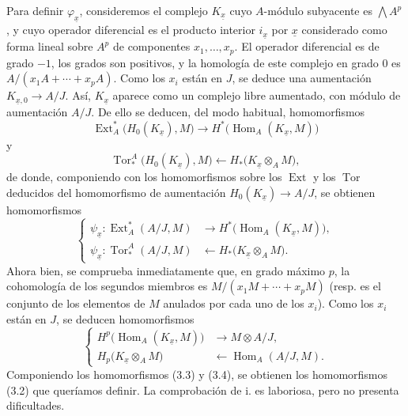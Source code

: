 \documentclass[11pt,twoside,openany]{book}
\numberwithin{equation}{section}
\theoremstyle{plain}
\theoremstyle{definition}
\theoremstyle{remark}
\theoremstyle{plain}
\theoremstyle{definition}
\theoremstyle{remark}
\begin{document}
Para definir $\varphi_{\underline{x}}$, consideremos el complejo
$K_{\underline{x}}$ cuyo $A$-módulo subyacente es $\bigwedge A^{p}$, y
cuyo operador diferencial es el producto interior $i_{\underline{x}}$ por
$\underline{x}$ considerado como forma lineal sobre $A^{p}$ de componentes
$x_1,\ldots,x_p$. El operador diferencial es de grado $-1$, los grados son
positivos, y la homología de este complejo en grado $0$ es
$A/(x_1A+\cdots+x_pA)$. Como los $x_i$ están en $J$, se deduce una
aumentación $K_{\underline{x},0}\longrightarrow A/J$. Así,
$K_{\underline{x}}$ aparece como un complejo libre aumentado, con módulo
de aumentación $A/J$. De ello se deducen, del modo habitual, homomorfismos
\[
\operatorname{Ext}_{A}^{*}\bigl(H_0(K_{\underline{x}}),M\bigr)
\longrightarrow
H^{*}\bigl(\operatorname{Hom}_{A}(K_{\underline{x}},M)\bigr)
\]
y
\[
\operatorname{Tor}_{*}^{A}\bigl(H_0(K_{\underline{x}}),M\bigr)
\longleftarrow
H_{*}\bigl(K_{\underline{x}}\otimes_A M\bigr),
\]
de donde, componiendo con los homomorfismos sobre los $\operatorname{Ext}$ y los
$\operatorname{Tor}$ deducidos del homomorfismo de aumentación
$H_0(K_{\underline{x}})\longrightarrow A/J$, se obtienen homomorfismos
\begin{equation}\tag{3.3}
\left\{
\begin{aligned}
\psi_{\underline{x}}:
\operatorname{Ext}_{A}^{*}(A/J,M)
&\longrightarrow H^{*}\bigl(\operatorname{Hom}_{A}(K_{\underline{x}},M)\bigr),\\
\psi_{\underline{x}}:
\operatorname{Tor}_{*}^{A}(A/J,M)
&\longleftarrow H_{*}\bigl(K_{\underline{x}}\otimes_A M\bigr).
\end{aligned}
\right.
\end{equation}
Ahora bien, se comprueba inmediatamente que, en grado máximo $p$, la cohomología de los segundos
miembros es $M/(x_1M+\cdots+x_pM)$ (resp. es el conjunto de los elementos de $M$
anulados por cada uno de los $x_i$). Como los $x_i$ están en $J$, se deducen
homomorfismos
\begin{equation}\tag{3.4}
\left\{
\begin{aligned}
H^{p}\bigl(\operatorname{Hom}_{A}(K_{\underline{x}},M)\bigr)
&\longrightarrow M\otimes A/J,\\
H_{p}\bigl(K_{\underline{x}}\otimes_A M\bigr)
&\longleftarrow\operatorname{Hom}_{A}(A/J,M).
\end{aligned}
\right.
\end{equation}
Componiendo los homomorfismos (3.3) y (3.4), se obtienen los homomorfismos (3.2)
que queríamos definir. La comprobación de i. es laboriosa, pero no
presenta dificultades.
\end{document}
